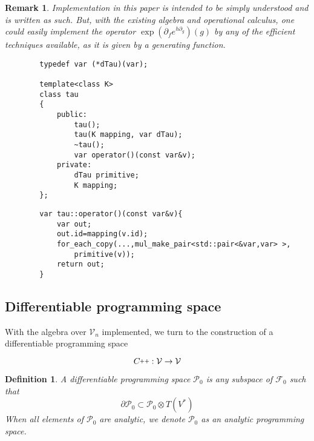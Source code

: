 \documentclass{article}
\newcommand{\VV}{\mathcal{V}}
\newcommand{\F}{\mathcal{F}}
\newcommand{\CC}{C\nolinebreak\hspace{-.05em}\raisebox{.4ex}{\tiny\bf +}\nolinebreak\hspace{-.10em}\raisebox{.4ex}{\tiny\bf +}}
\def\CC{{C\nolinebreak[4]\hspace{-.05em}\raisebox{.4ex}{\tiny\bf ++}}}
\newcommand{\dP}{\mathcal{P}}
\newcommand{\D}{\partial}
\newtheorem{definicija}{Definition}[section]
\newtheorem{opomba}{Remark}[section]
\begin{document}
          \begin{opomba}
          Implementation in this paper is intended to be simply understood and is written as such. But, with the existing algebra and operational calculus, one could easily implement the operator $\exp(\D_fe^{h\D_g})(g)$ by any of the efficient techniques available, as it is given by a generating function.
          \end{opomba}
        
        \begin{lstlisting}
        typedef var (*dTau)(var);
        
        template<class K>
        class tau
        {
            public:
                tau();
                tau(K mapping, var dTau);
                ~tau();
                var operator()(const var&v);
            private:
                dTau primitive;
                K mapping;
        };
        \end{lstlisting}
        
        \begin{lstlisting}
        var tau::operator()(const var&v){
            var out;
            out.id=mapping(v.id);
            for_each_copy(...,mul_make_pair<std::pair<&var,var> >, 
            	primitive(v));
            return out;
        }
        \end{lstlisting}
        
          \subsection{Differentiable programming space}
              
              With the algebra over $\VV_n$ implemented, we turn to the construction of a differentiable programming space
              
              \begin{equation}
              \CC:\VV\to\VV
              \end{equation}
              
              \begin{definicija}\label{def:dP}
               	A \emph{differentiable programming space} $\dP_0$ is any subspace of $\F_0$ such that
               	\begin{equation}\label{eq:P}
               	\D\dP_0\subset\dP_0\otimes T(V^*)
               	\end{equation}
               	When all elements of $\dP_0$ are analytic, we denote $\dP_0$ as an \emph{analytic programming space}.
               \end{definicija}
              
\end{document}

